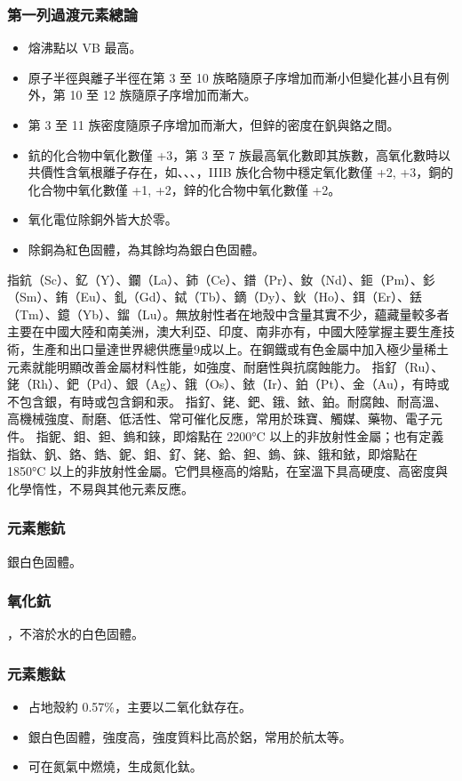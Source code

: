 \documentclass[a4paper,12pt]{report}
\begin{document}
\begin{itemize}
\begin{itemize}
\subsubsection{第一列過渡元素總論}
\begin{itemize}
\item 熔沸點以 VB 最高。
\item 原子半徑與離子半徑在第 3 至 10 族略隨原子序增加而漸小但變化甚小且有例外，第 10 至 12 族隨原子序增加而漸大。
\item 第 3 至 11 族密度隨原子序增加而漸大，但鋅的密度在釩與鉻之間。
\item 鈧的化合物中氧化數僅 +3，第 3 至 7 族最高氧化數即其族數，高氧化數時以共價性含氧根離子存在，如、、、，IIIB 族化合物中穩定氧化數僅 +2, +3，銅的化合物中氧化數僅 +1, +2，鋅的化合物中氧化數僅 +2。
\item 氧化電位除銅外皆大於零。
\item 除銅為紅色固體，為其餘均為銀白色固體。
\end{itemize}
指鈧（Sc）、釔（Y）、鑭（La）、鈰（Ce）、鐠（Pr）、釹（Nd）、鉕（Pm）、釤（Sm）、銪（Eu）、釓（Gd）、鋱（Tb）、鏑（Dy）、鈥（Ho）、鉺（Er）、銩（Tm）、鐿（Yb）、鎦（Lu）。無放射性者在地殼中含量其實不少，蘊藏量較多者主要在中國大陸和南美洲，澳大利亞、印度、南非亦有，中國大陸掌握主要生產技術，生產和出口量達世界總供應量9成以上。在鋼鐵或有色金屬中加入極少量稀土元素就能明顯改善金屬材料性能，如強度、耐磨性與抗腐蝕能力。
指釕（Ru）、銠（Rh）、鈀（Pd）、銀（Ag）、鋨（Os）、銥（Ir）、鉑（Pt）、金（Au），有時或不包含銀，有時或包含銅和汞。
指釕、銠、鈀、鋨、銥、鉑。耐腐蝕、耐高溫、高機械強度、耐磨、低活性、常可催化反應，常用於珠寶、觸媒、藥物、電子元件。
指鈮、鉬、鉭、鎢和錸，即熔點在 2200°C 以上的非放射性金屬；也有定義指鈦、釩、鉻、鋯、鈮、鉬、釕、銠、鉿、鉭、鎢、錸、鋨和銥，即熔點在 1850°C 以上的非放射性金屬。它們具極高的熔點，在室溫下具高硬度、高密度與化學惰性，不易與其他元素反應。
\subsubsection{元素態鈧}
銀白色固體。
\subsubsection{氧化鈧}
，不溶於水的白色固體。
\subsubsection{元素態鈦}
\begin{itemize}
\item 占地殼約 0.57\%，主要以二氧化鈦存在。
\item 銀白色固體，強度高，強度質料比高於鋁，常用於航太等。
\item 可在氮氣中燃燒，生成氮化鈦。
\end{itemize}

\end{itemize}
\end{itemize}
\end{document}
